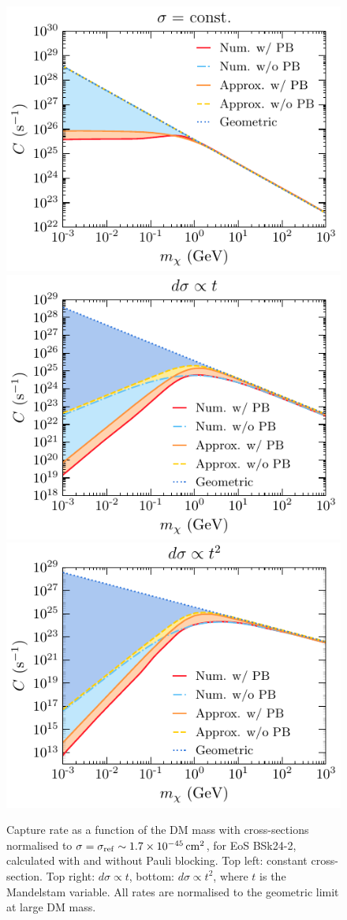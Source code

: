 \begin{figure}
    \centering
    \includegraphics[width=.48\textwidth]{capture_1/capture_rate_n0.pdf}
    \includegraphics[width=.48\textwidth]{capture_1/capture_rate_n1.pdf}\\
    \includegraphics[width=.48\textwidth]{capture_1/capture_rate_n2.pdf}
    \caption{Capture rate as a function of the DM mass with cross-sections normalised to $\sigma=\sigma_\mathrm{ref}\sim 1.7 \times 10^{-45} {\rm \,cm}^2$, for EoS BSk24-2, calculated with and without Pauli blocking. Top left: constant cross-section. Top right: $d\sigma\propto t$, bottom: $d\sigma\propto t^2$, where $t$ is the Mandelstam variable. All rates are normalised to the geometric limit at large DM mass. }
    \label{ch3:fig:approxc}
\end{figure}


